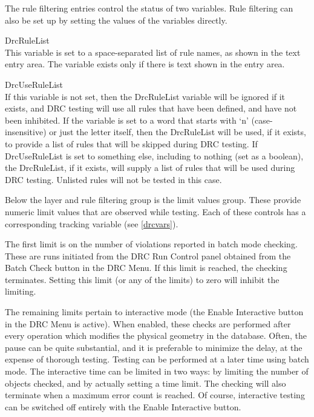 The rule filtering entries control the status of two variables.  Rule
filtering can also be set up by setting the values of the variables
directly.

\begin{description}
\item{\et DrcRuleList}\\
This variable is set to a space-separated list of rule names, as shown
in the text entry area.  The variable exists only if there is text
shown in the entry area.

\item{\et DrcUseRuleList}\\
If this variable is not set, then the {\et DrcRuleList} variable will
be ignored if it exists, and DRC testing will use all rules that have
been defined, and have not been inhibited.  If the variable is set to
a word that starts with `{\vt n}' (case-insensitive) or just the
letter itself, then the {\et DrcRuleList} will be used, if it exists,
to provide a list of rules that will be skipped during DRC testing. 
If {\et DrcUseRuleList} is set to something else, including to nothing
(set as a boolean), the {\et DrcRuleList}, if it exists, will supply a
list of rules that will be used during DRC testing.  Unlisted rules
will not be tested in this case.
\end{description}

Below the layer and rule filtering group is the limit values group. 
These provide numeric limit values that are observed while testing. 
Each of these controls has a corresponding tracking variable (see
\ref{drcvars}).

The first limit is on the number of violations reported in batch mode
checking.  These are runs initiated from the {\cb DRC Run Control}
panel obtained from the {\cb Batch Check} button in the {\cb DRC
Menu}.  If this limit is reached, the checking terminates.  Setting
this limit (or any of the limits) to zero will inhibit the limiting.

The remaining limits pertain to interactive mode (the {\cb Enable
Interactive} button in the {\cb DRC Menu} is active).  When enabled,
these checks are performed after every operation which modifies the
physical geometry in the database.  Often, the pause can be quite
substantial, and it is preferable to minimize the delay, at the
expense of thorough testing.  Testing can be performed at a later time
using batch mode.  The interactive time can be limited in two ways: 
by limiting the number of objects checked, and by actually setting a
time limit.  The checking will also terminate when a maximum error
count is reached.  Of course, interactive testing can be switched off
entirely with the {\cb Enable Interactive} button.

